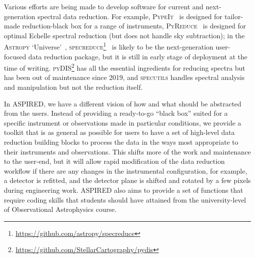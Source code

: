 \documentclass[linenumbers, twocolumn]{aastex631}
\begin{document}
Various efforts are being made to develop software for current and
next-generation spectral data reduction. For example,
\textsc{PypeIt}~\citep{pypeit:zenodo, 2020JOSS....5.2308P} is designed for
tailor-made reduction-black box for a range of instruments,
\textsc{PyReduce}~\citep{2021A&A...646A..32P} is designed for optimal Echelle
spectral reduction (but does not handle sky subtraction); in the \textsc{Astropy}
`Universe'~\citep{astropy:2013, astropy:2018},
\textsc{specreduce}\footnote{\url{https://github.com/astropy/specreduce}}~\citep{pickering_timothy_2022_7007991} is likely to be the
next-generation user-focused data reduction package, but it is still in early
stage of deployment at the time of writing.
\textsc{pyDIS}\footnote{\url{https://github.com/StellarCartography/pydis}} has
all the essential ingredients for reducing spectra but has been out of
maintenance since 2019, and \textsc{specutils}
handles spectral analysis and manipulation but not the reduction itself.

In \textsc{ASPIRED}, we have a different vision of how and what should be
abstracted from the users. Instead of providing a ready-to-go ``black box''
suited for a specific instrument or observations made in particular conditions,
we provide a toolkit that is as general as possible for users to have a set of
high-level data reduction building blocks to process the data in the ways most
appropriate to their instruments and observations. This shifts more of the work
and maintenance to the user-end, but it will allow rapid modification of the
data reduction workflow if there are any changes in the instrumental
configuration, for example, a detector is refitted, and the detector plane is
shifted and rotated by a few pixels during engineering work. \textsc{ASPIRED}
also aims to provide a set of functions that require coding skills that students 
should have attained from the university-level of Observational Astrophysics
course.
\end{document}
